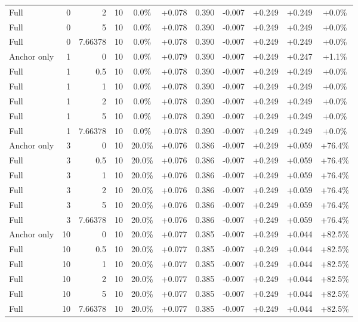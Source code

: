 \begin{table}[htbp]
\begin{tabular}{lrrrccccccc}
Full & 0 & 2 & 10 & 0.0\% & +0.078 & 0.390 & -0.007 & +0.249 & +0.249 & +0.0\% \\
Full & 0 & 5 & 10 & 0.0\% & +0.078 & 0.390 & -0.007 & +0.249 & +0.249 & +0.0\% \\
Full & 0 & 7.66378 & 10 & 0.0\% & +0.078 & 0.390 & -0.007 & +0.249 & +0.249 & +0.0\% \\
Anchor only & 1 & 0 & 10 & 0.0\% & +0.079 & 0.390 & -0.007 & +0.249 & +0.247 & +1.1\% \\
Full & 1 & 0.5 & 10 & 0.0\% & +0.078 & 0.390 & -0.007 & +0.249 & +0.249 & +0.0\% \\
Full & 1 & 1 & 10 & 0.0\% & +0.078 & 0.390 & -0.007 & +0.249 & +0.249 & +0.0\% \\
Full & 1 & 2 & 10 & 0.0\% & +0.078 & 0.390 & -0.007 & +0.249 & +0.249 & +0.0\% \\
Full & 1 & 5 & 10 & 0.0\% & +0.078 & 0.390 & -0.007 & +0.249 & +0.249 & +0.0\% \\
Full & 1 & 7.66378 & 10 & 0.0\% & +0.078 & 0.390 & -0.007 & +0.249 & +0.249 & +0.0\% \\
Anchor only & 3 & 0 & 10 & 20.0\% & +0.076 & 0.386 & -0.007 & +0.249 & +0.059 & +76.4\% \\
Full & 3 & 0.5 & 10 & 20.0\% & +0.076 & 0.386 & -0.007 & +0.249 & +0.059 & +76.4\% \\
Full & 3 & 1 & 10 & 20.0\% & +0.076 & 0.386 & -0.007 & +0.249 & +0.059 & +76.4\% \\
Full & 3 & 2 & 10 & 20.0\% & +0.076 & 0.386 & -0.007 & +0.249 & +0.059 & +76.4\% \\
Full & 3 & 5 & 10 & 20.0\% & +0.076 & 0.386 & -0.007 & +0.249 & +0.059 & +76.4\% \\
Full & 3 & 7.66378 & 10 & 20.0\% & +0.076 & 0.386 & -0.007 & +0.249 & +0.059 & +76.4\% \\
Anchor only & 10 & 0 & 10 & 20.0\% & +0.077 & 0.385 & -0.007 & +0.249 & +0.044 & +82.5\% \\
Full & 10 & 0.5 & 10 & 20.0\% & +0.077 & 0.385 & -0.007 & +0.249 & +0.044 & +82.5\% \\
Full & 10 & 1 & 10 & 20.0\% & +0.077 & 0.385 & -0.007 & +0.249 & +0.044 & +82.5\% \\
Full & 10 & 2 & 10 & 20.0\% & +0.077 & 0.385 & -0.007 & +0.249 & +0.044 & +82.5\% \\
Full & 10 & 5 & 10 & 20.0\% & +0.077 & 0.385 & -0.007 & +0.249 & +0.044 & +82.5\% \\
Full & 10 & 7.66378 & 10 & 20.0\% & +0.077 & 0.385 & -0.007 & +0.249 & +0.044 & +82.5\% \\

\end{tabular}
\end{table}
